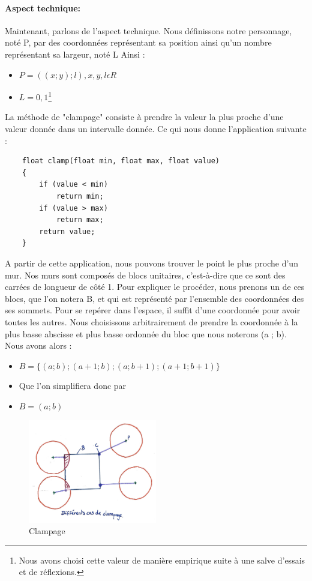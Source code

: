 \documentclass[12pt]{report}
\begin{document}
\paragraph{Aspect technique: }
Maintenant, parlons de l'aspect technique.
Nous définissons notre personnage, noté P, par des coordonnées représentant 
sa position ainsi qu'un nombre représentant sa largeur, noté L Ainsi :

\begin{itemize}
	\item[] $P = ((x ; y) ; l), x, y, l \epsilon R$ 
	\item[] $L = 0,1$\footnote{Nous avons choisi cette valeur de manière 
	empirique suite à une salve d'essais et de réflexions.}
\end{itemize}

La méthode de "clampage" consiste à prendre la valeur la plus proche d'une 
valeur donnée dans un intervalle donnée.
Ce qui nous donne l'application suivante :

\begin{verbatim}
	float clamp(float min, float max, float value)
	{
		if (value < min)
			return min;
		if (value > max)
			return max;
		return value;
	}
\end{verbatim}


A partir de cette application, nous pouvons trouver le point le plus proche 
d'un mur. Nos murs sont composés de blocs unitaires, c'est-à-dire que ce 
sont des carrées de longueur de côté 1. Pour expliquer le procéder, nous 
prenons un de ces blocs, que l'on notera B, et qui est représenté par 
l'ensemble des coordonnées des ses sommets. Pour se repérer dans l'espace, 
il suffit d'une coordonnée pour avoir toutes les autres. Nous choisissons 
arbitrairement de prendre la coordonnée à la plus basse abscisse et plus 
basse ordonnée du bloc que nous noterons (a ; b). Nous avons alors :

\begin{itemize}
	\item[]	$B = \{(a ; b) ; (a + 1 ; b) ; (a ; b + 1) ; (a + 1 ; b + 1)\}$
	\item[] Que l'on simplifiera donc par
	\item[] $B = (a ; b)$
\end{itemize}

\begin{figure}
	\centering
	\includegraphics[width=0.5\textwidth]{image/fig4.jpg}
	\caption{Clampage}
	\label{fig:clampage}
\end{figure}
\end{document}
